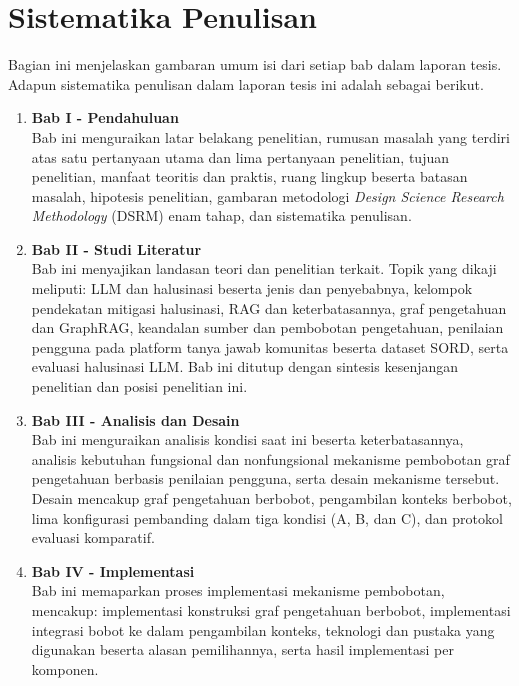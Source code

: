 \section{Sistematika Penulisan}
\label{sec:sistematika}

Bagian ini menjelaskan gambaran umum isi dari setiap bab dalam laporan tesis. Adapun sistematika penulisan dalam laporan tesis ini adalah sebagai berikut.

\begin{enumerate}
    \item \textbf{Bab I - Pendahuluan}\\
    Bab ini menguraikan latar belakang penelitian, rumusan masalah yang terdiri atas satu pertanyaan utama dan lima pertanyaan penelitian, tujuan penelitian, manfaat teoritis dan praktis, ruang lingkup beserta batasan masalah, hipotesis penelitian, gambaran metodologi \emph{Design Science Research Methodology} (DSRM) enam tahap, dan sistematika penulisan.

    \item \textbf{Bab II - Studi Literatur}\\
    Bab ini menyajikan landasan teori dan penelitian terkait. Topik yang dikaji meliputi: LLM dan halusinasi beserta jenis dan penyebabnya, kelompok pendekatan mitigasi halusinasi, RAG dan keterbatasannya, graf pengetahuan dan GraphRAG, keandalan sumber dan pembobotan pengetahuan, penilaian pengguna pada platform tanya jawab komunitas beserta dataset SORD, serta evaluasi halusinasi LLM. Bab ini ditutup dengan sintesis kesenjangan penelitian dan posisi penelitian ini.
    
    \item \textbf{Bab III - Analisis dan Desain}\\
    Bab ini menguraikan analisis kondisi saat ini beserta keterbatasannya, analisis kebutuhan fungsional dan nonfungsional mekanisme pembobotan graf pengetahuan berbasis penilaian pengguna, serta desain mekanisme tersebut. Desain mencakup graf pengetahuan berbobot, pengambilan konteks berbobot, lima konfigurasi pembanding dalam tiga kondisi (A, B, dan C), dan protokol evaluasi komparatif.


    \item \textbf{Bab IV - Implementasi}\\
     Bab ini memaparkan proses implementasi mekanisme pembobotan, mencakup: implementasi konstruksi graf pengetahuan berbobot, implementasi integrasi bobot ke dalam pengambilan konteks, teknologi dan pustaka yang digunakan beserta alasan pemilihannya, serta hasil implementasi per komponen.


\end{enumerate}

